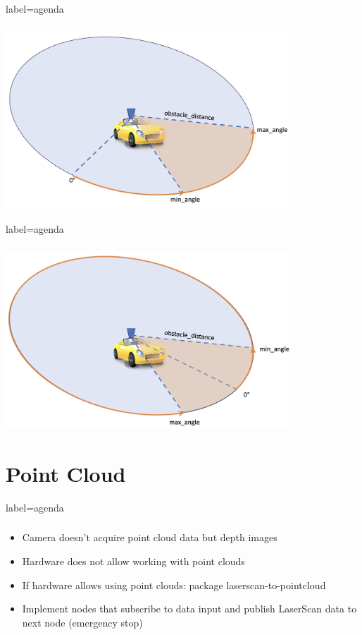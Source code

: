 \documentclass[numberofslides]{AMSBeamer}
\begin{document}
\begin{frame}{label=agenda}
    \frametitle{\insertsectionhead}
    \begin{center}
        \includegraphics[width=0.8\textwidth]{Presentations/LaTeX/images/estop-normal.jpeg}
    \end{center}
\end{frame}

\begin{frame}{label=agenda}
    \frametitle{\insertsectionhead}
    \begin{center}
        \includegraphics[width=0.8\textwidth]{Presentations/LaTeX/images/estop-ausnahmefall.jpeg}
    \end{center}
\end{frame}

\section{Point Cloud}
\begin{frame}{label=agenda}
    \frametitle{\insertsectionhead}
    \begin{itemize}
        \item Camera doesn’t acquire point cloud data but depth images
        \item Hardware does not allow working with point clouds
        \item If hardware allows using point clouds: package laserscan-to-pointcloud
        \item Implement nodes that subscribe to data input and publish LaserScan data to next node (emergency stop)

    \end{itemize}
\end{frame}
\end{document}
